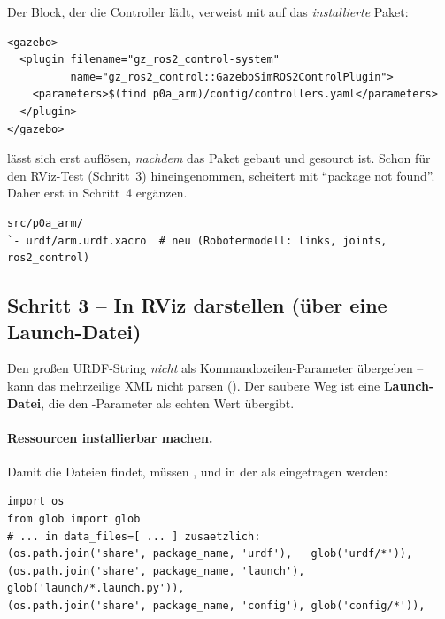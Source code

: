\begin{warnbox}[title=Der \code{<gazebo>}-Plugin-Block kommt erst in Schritt 4]
Der Block, der die Controller lädt, verweist mit  auf das
\emph{installierte} Paket:
\begin{lstlisting}[style=xml]
<gazebo>
  <plugin filename="gz_ros2_control-system"
          name="gz_ros2_control::GazeboSimROS2ControlPlugin">
    <parameters>$(find p0a_arm)/config/controllers.yaml</parameters>
  </plugin>
</gazebo>
\end{lstlisting}
 lässt sich erst auflösen, \emph{nachdem} das Paket gebaut
und gesourct ist. Schon für den RViz-Test (Schritt~3) hineingenommen, scheitert
 mit ``package not found''. Daher erst in Schritt~4 ergänzen.
\end{warnbox}
\begin{lstlisting}[style=bash,caption={\code{ros2\_ws}-Delta nach Schritt 2 (\# neu / \# angepasst)}]
src/p0a_arm/
`- urdf/arm.urdf.xacro  # neu (Robotermodell: links, joints, ros2_control)
\end{lstlisting}

\subsection{Schritt 3 -- In RViz darstellen (über eine Launch-Datei)}
Den großen URDF-String \emph{nicht} als Kommandozeilen-Parameter übergeben --
 kann das mehrzeilige XML nicht parsen (). Der saubere Weg ist eine \textbf{Launch-Datei}, die
 den -Parameter als echten
Wert übergibt.

\paragraph{Ressourcen installierbar machen.} Damit  die Dateien
findet, müssen ,  und  in der
 als  eingetragen werden:
\begin{lstlisting}[style=py,caption={Ergänzung in \code{setup.py}}]
import os
from glob import glob
# ... in data_files=[ ... ] zusaetzlich:
(os.path.join('share', package_name, 'urdf'),   glob('urdf/*')),
(os.path.join('share', package_name, 'launch'), glob('launch/*.launch.py')),
(os.path.join('share', package_name, 'config'), glob('config/*')),
\end{lstlisting}

